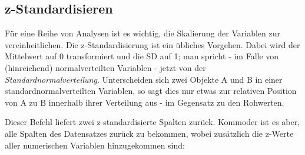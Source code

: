 \documentclass[12pt,]{book}
\makeatletter
\newenvironment{Shaded}{\begin{snugshade}}{\end{snugshade}}
\newcommand{\KeywordTok}[1]{\textcolor[rgb]{0.13,0.29,0.53}{\textbf{{#1}}}}
\newcommand{\StringTok}[1]{\textcolor[rgb]{0.31,0.60,0.02}{{#1}}}
\newcommand{\CommentTok}[1]{\textcolor[rgb]{0.56,0.35,0.01}{\textit{{#1}}}}
\newcommand{\NormalTok}[1]{{#1}}
\newenvironment{kframe}{%
\medskip{}
\setlength{\fboxsep}{.8em}
 \def\at@end@of@kframe{}%
 \ifinner\ifhmode%
  \def\at@end@of@kframe{\end{minipage}}%
  \begin{minipage}{\columnwidth}%
 \fi\fi%
 \def\FrameCommand##1{\hskip\@totalleftmargin \hskip-\fboxsep
 \colorbox{shadecolor}{##1}\hskip-\fboxsep
     \hskip-\linewidth \hskip-\@totalleftmargin \hskip\columnwidth}%
 \MakeFramed {\advance\hsize-\width
   \@totalleftmargin\z@ \linewidth\hsize
   \@setminipage}}%
 {\par\unskip\endMakeFramed%
 \at@end@of@kframe}
\renewenvironment{Shaded}{\begin{kframe}}{\end{kframe}}
\makeatother
\begin{document}
\subsection{z-Standardisieren}\label{z-standardisieren}

Für eine Reihe von Analysen ist es wichtig, die Skalierung der Variablen
zur vereinheitlichen. Die z-Standardisierung ist ein übliches Vorgehen.
Dabei wird der Mittelwert auf 0 transformiert und die SD auf 1; man
spricht - im Falle von (hinreichend) normalverteilten Variablen - jetzt
von der \emph{Standardnormalverteilung}.
Unterscheiden sich zwei Objekte A und B in einer
standardnormalverteilten Variablen, so sagt dies nur etwas zur relativen
Position von A zu B innerhalb ihrer Verteilung aus - im Gegensatz zu den
Rohwerten.

\begin{Shaded}
\end{Shaded}

Dieser Befehl liefert zwei z-standardisierte Spalten zurück. Kommoder
ist es aber, alle Spalten des Datensatzes zurück zu bekommen, wobei
zusätzlich die z-Werte aller numerischen Variablen hinzugekommen sind:

\begin{Shaded}
\end{Shaded}
\end{document}
